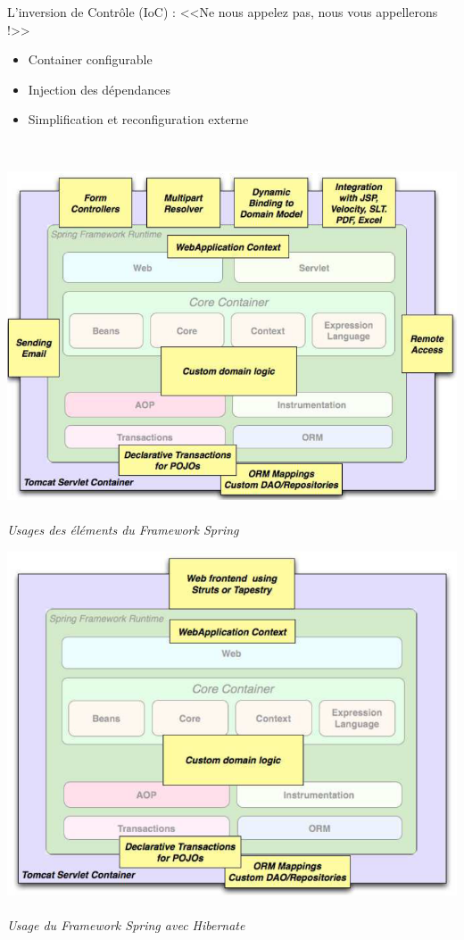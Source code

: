 \documentclass[11pt,twoside,a4paper]{article}
\begin{document}
\begin{landscape}
\begin{multicols}{2}
	
	L'inversion de Contr{\^o}le (IoC) : <<Ne nous appelez pas, nous vous appellerons !>>
	\begin{itemize}
		\item Container configurable
		\item Injection des d{\'e}pendances
		\item Simplification et reconfiguration externe
	\end{itemize}~\\
	
	\vfill
	\columnbreak
	
	\includegraphics[width=0.90\linewidth]{./SpringFrameworkRuntimeUsage.png}~\\
	\emph{\footnotesize Usages des {\'e}l{\'e}ments du Framework Spring}
	
	\vfill
	
	\includegraphics[width=0.90\linewidth]{./SpringFrameworkRuntimeUsageHibernate.png}~\\
	\emph{\footnotesize Usage du Framework Spring avec Hibernate}
	

\end{multicols}
\end{landscape}
\end{document}
